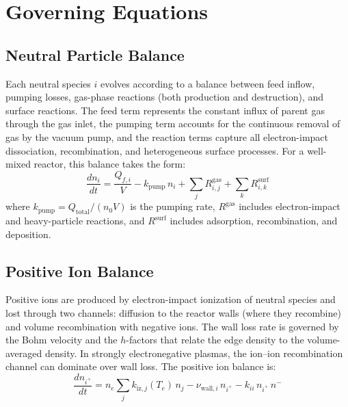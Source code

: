\documentclass[11pt,a4paper]{report}
\newcommand{\Te}{T_e}
\begin{document}
\section{Governing Equations}
\label{sec:pure_gov}

\subsection{Neutral Particle Balance}
\label{sec:pure_neutral_balance}

Each neutral species $i$ evolves according to a balance between feed inflow, pumping losses, gas-phase reactions (both production and destruction), and surface reactions.  The feed term represents the constant influx of parent gas through the gas inlet, the pumping term accounts for the continuous removal of gas by the vacuum pump, and the reaction terms capture all electron-impact dissociation, recombination, and heterogeneous surface processes.  For a well-mixed reactor, this balance takes the form:
\begin{equation}
\boxed{\frac{dn_i}{dt} = \frac{Q_{f,i}}{V} - k_\text{pump}\,n_i + \sum_j R^\text{gas}_{i,j} + \sum_k R^\text{surf}_{i,k}}
\label{eq:pure_neutral}
\end{equation}
where $k_\text{pump} = Q_\text{total}/(n_0 V)$ is the pumping rate, $R^\text{gas}$ includes electron-impact and heavy-particle reactions, and $R^\text{surf}$ includes adsorption, recombination, and deposition.

\subsection{Positive Ion Balance}
\label{sec:pure_pos_ion}

Positive ions are produced by electron-impact ionization of neutral species and lost through two channels: diffusion to the reactor walls (where they recombine) and volume recombination with negative ions.  The wall loss rate is governed by the Bohm velocity and the $h$-factors that relate the edge density to the volume-averaged density.  In strongly electronegative plasmas, the ion--ion recombination channel can dominate over wall loss.  The positive ion balance is:
\begin{equation}
\boxed{\frac{dn_{i^+}}{dt} = n_e \sum_j k_{\text{iz},j}(\Te)\,n_j - \nu_{\text{wall},i}\,n_{i^+} - k_{ii}\,n_{i^+}\,n^-}
\label{eq:pure_posion}
\end{equation}
\end{document}
